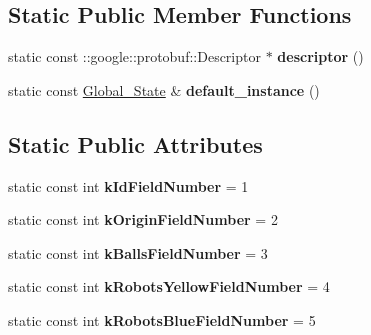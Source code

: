 \subsection*{Static Public Member Functions}
\begin{DoxyCompactItemize}
\item 
static const \+::google\+::protobuf\+::\+Descriptor $\ast$ {\bfseries descriptor} ()\hypertarget{classvss__state_1_1Global__State_af5963eb38d472f2508e180fdf42c4a22}{}\label{classvss__state_1_1Global__State_af5963eb38d472f2508e180fdf42c4a22}

\item 
static const \hyperlink{classvss__state_1_1Global__State}{Global\+\_\+\+State} \& {\bfseries default\+\_\+instance} ()\hypertarget{classvss__state_1_1Global__State_a1bf08b600180f360bcd37c58f3e50b16}{}\label{classvss__state_1_1Global__State_a1bf08b600180f360bcd37c58f3e50b16}

\end{DoxyCompactItemize}
\subsection*{Static Public Attributes}
\begin{DoxyCompactItemize}
\item 
static const int {\bfseries k\+Id\+Field\+Number} = 1\hypertarget{classvss__state_1_1Global__State_adc3acf2d9111dd7e0e442b1c8f8743ab}{}\label{classvss__state_1_1Global__State_adc3acf2d9111dd7e0e442b1c8f8743ab}

\item 
static const int {\bfseries k\+Origin\+Field\+Number} = 2\hypertarget{classvss__state_1_1Global__State_a124e80222f404a8607d383c6b626b98a}{}\label{classvss__state_1_1Global__State_a124e80222f404a8607d383c6b626b98a}

\item 
static const int {\bfseries k\+Balls\+Field\+Number} = 3\hypertarget{classvss__state_1_1Global__State_a7ccc5ad24ae6460151ee94fd5f3800f5}{}\label{classvss__state_1_1Global__State_a7ccc5ad24ae6460151ee94fd5f3800f5}

\item 
static const int {\bfseries k\+Robots\+Yellow\+Field\+Number} = 4\hypertarget{classvss__state_1_1Global__State_a3dbd17117a81ad417c69ca945668edaa}{}\label{classvss__state_1_1Global__State_a3dbd17117a81ad417c69ca945668edaa}

\item 
static const int {\bfseries k\+Robots\+Blue\+Field\+Number} = 5\hypertarget{classvss__state_1_1Global__State_a69fd6df3aa2671364cb92838e3824e81}{}\label{classvss__state_1_1Global__State_a69fd6df3aa2671364cb92838e3824e81}

\end{DoxyCompactItemize}
